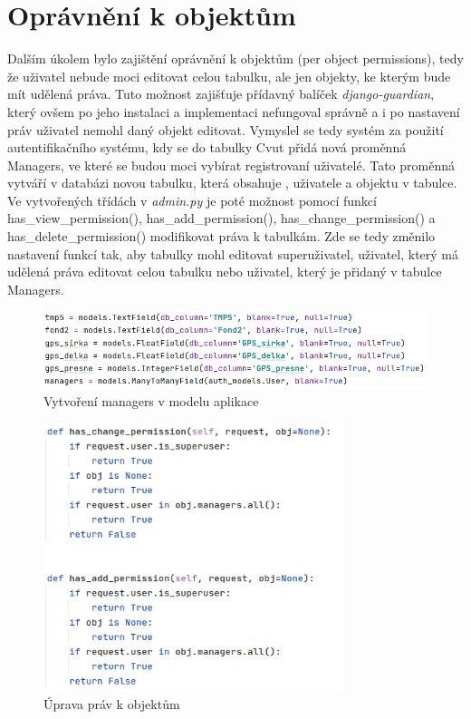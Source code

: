 \section{Oprávnění k objektům}
\label{pop}
Dalším úkolem bylo zajištění oprávnění k objektům (per object permissions), tedy že uživatel nebude moci editovat celou tabulku, ale jen objekty, ke kterým bude mít udělená práva. Tuto možnost zajišťuje přídavný balíček \emph{django-guardian}, který ovšem po jeho instalaci a implementaci nefungoval správně a i po nastavení práv uživatel nemohl daný objekt editovat. Vymyslel se tedy systém za použití autentifikačního systému, kdy se do tabulky Cvut přidá nová proměnná Managers, ve které se budou moci vybírat registrovaní uživatelé. Tato proměnná vytváří v databázi novou tabulku, která obsahuje ,  uživatele a  objektu v tabulce. Ve vytvořených třídách v \emph{admin.py} je poté možnost pomocí funkcí has\_view\_permission(), has\_add\_permission(), has\_change\_permission() a has\_delete\_permission() mo\-difikovat práva k tabulkám. Zde se tedy změnilo nastavení funkcí tak, aby tabulky mohl editovat superuživatel, uživatel, který má udělená práva editovat celou tabulku nebo uživatel, který je přidaný v tabulce Managers. 

\begin{figure}[H] \centering
    \includegraphics[width=330pt]{./pictures/11-managers-model.PNG}
    \caption[Vytvoření managers v modelu aplikace]{Vytvoření managers v modelu aplikace}
	\label{fig:Vytvoření managers v modelu aplikace}              
\end{figure}

\begin{figure}[H] \centering
    \includegraphics[width=250pt]{./pictures/14-object-permissions.PNG}
    \caption[Úprava práv k objektům]{Úprava práv k objektům}
	\label{fig:Úprava práv k objektům}              
\end{figure}


